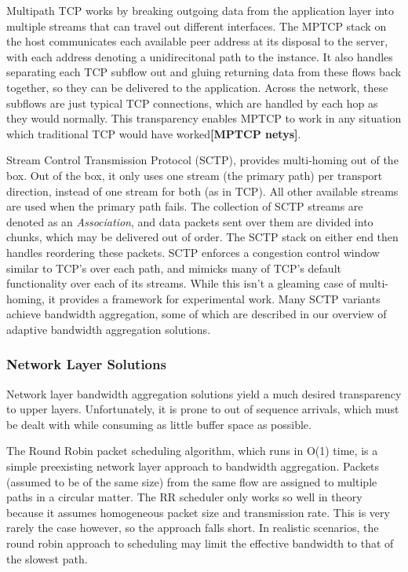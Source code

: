 \documentclass[12pt]{article}
\newcommand{\lcite}[1]
{{\bfseries\color{orange}[#1]}}
\begin{document}
		Multipath TCP works by breaking outgoing data from the application layer into multiple streams that can travel out different interfaces. The MPTCP stack on the host communicates each available peer address at its disposal to the server, with each address denoting a unidirecitonal path to the instance. It also handles separating each TCP subflow out and gluing returning data from these flows back together, so they can be delivered to the application. Across the network, these subflows are just typical TCP connections, which are handled by each hop as they would normally. This transparency enables MPTCP to work in any situation which traditional TCP would have worked\lcite{MPTCP netys}.

		Stream Control Transmission Protocol (SCTP), provides multi-homing out of the box. Out of the box, it only uses one stream (the primary path) per transport direction, instead of one stream for both (as in TCP). All other available streams are used when the primary path fails. The collection of SCTP streams are denoted as an {\it Association}, and data packets sent over them are divided into chunks, which may be delivered out of order. The SCTP stack on either end then handles reordering these packets. SCTP enforces a congestion control window similar to TCP's over each path, and mimicks many of TCP's default functionality over each of its streams\cite{5763587}. While this isn't a gleaming case of multi-homing, it provides a framework for experimental work. Many SCTP variants achieve bandwidth aggregation, some of which are described in our overview of adaptive bandwidth aggregation solutions.

	\subsubsection{Network Layer Solutions}

		Network layer bandwidth aggregation solutions yield a much desired transparency to upper layers. Unfortunately, it is prone to out of sequence arrivals, which must be dealt with while consuming as little buffer space as possible.

		The Round Robin packet scheduling algorithm, which runs in O(1) time, is a simple preexisting network layer approach to bandwidth aggregation. Packets (assumed to be of the same size) from the same flow are assigned to multiple paths in a circular matter. The RR scheduler only works so well in theory because it assumes homogeneous packet size and transmission rate. This is very rarely the case however, so the approach falls short. In realistic scenarios, the round robin approach to scheduling may limit the effective bandwidth to that of the slowest path.%
\end{document}
